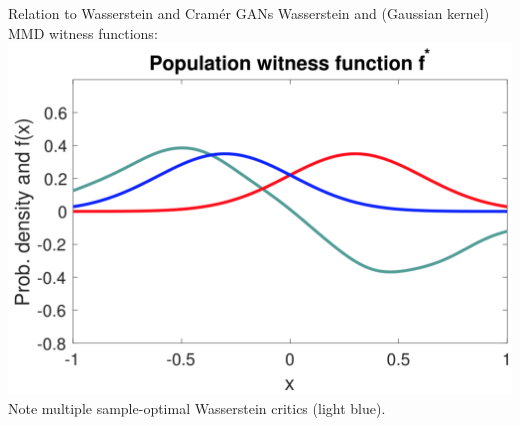 \documentclass[xcolor={table}]{beamer}
\begin{document}
\begin{frame}{}
\begin{columns}[T, totalwidth=\textwidth]
\begin{column}{.32\textwidth}
\begin{block}{Relation to Wasserstein and Cram\'er GANs}
      Wasserstein and (Gaussian kernel) MMD witness functions: \\[1ex]
      \includegraphics[width=\linewidth]{figs/witness.png}\\
      Note multiple sample-optimal Wasserstein critics (light blue).
    \end{block}
  \end{column}


\end{columns}
\end{frame}
\end{document}
